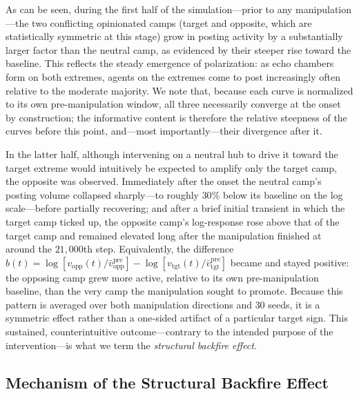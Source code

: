 \documentclass[pdflatex,sn-mathphys-num]{sn-jnl}%
\theoremstyle{thmstyleone}%
\theoremstyle{thmstyletwo}%
\theoremstyle{thmstylethree}%
\begin{document}
As can be seen, during the first half of the simulation---prior 
to any manipulation---the two conflicting opinionated camps (target and opposite, 
which are statistically symmetric at this stage) grow in posting 
activity by a substantially larger factor than the neutral camp, 
as evidenced by their steeper rise toward the baseline. 
This reflects the steady emergence of polarization: as echo chambers 
form on both extremes, agents on the extremes come to post increasingly 
often relative to the moderate majority. We note that, because each 
curve is normalized to its own pre-manipulation window, 
all three necessarily converge at the onset by construction; 
the informative content is therefore the relative steepness 
of the curves before this point, and---most importantly---their 
divergence after it.
\par

In the latter half, although intervening on a neutral hub to drive 
it toward the target extreme would intuitively be expected to 
amplify only the target camp, the opposite was observed. 
Immediately after the onset the neutral camp's posting volume 
collapsed sharply---to roughly $30\%$ below its baseline on the 
log scale---before partially recovering; and after a brief 
initial transient in which the target camp ticked up, 
the opposite camp's log-response rose above that of the 
target camp and remained elevated long after the manipulation
finished at around the $21{,}000$th step. Equivalently,
the difference $b(t) = \log[v_{\text{opp}}(t)/\bar v_{\text{opp}}^{\text{pre}}] - \log[v_{\text{tgt}}(t)/\bar v_{\text{tgt}}^{\text{pre}}]$ 
became and stayed positive: the opposing camp grew 
more active, relative to its own pre-manipulation baseline, 
than the very camp the manipulation sought to promote. 
Because this pattern is averaged over both manipulation 
directions and $30$ seeds, it is a symmetric 
effect rather than a one-sided artifact of a particular target sign. 
This sustained, counterintuitive outcome---contrary to the 
intended purpose of the intervention---is what we
term the \emph{structural backfire effect}.
\par

\subsection{Mechanism of the Structural Backfire Effect}\label{backfire_mechanism}
\end{document}
